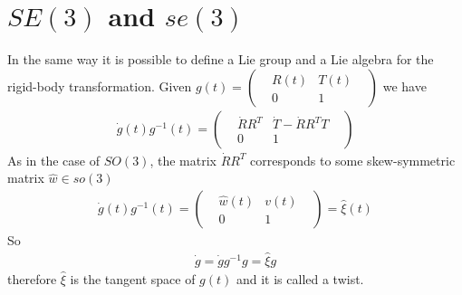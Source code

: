 \documentclass{report}
\begin{document}
\section{$SE(3)$ and $se(3)$}
In the same way it is possible to define a Lie group and a Lie algebra for the rigid-body transformation.
Given $g(t) = \left(
    \begin{matrix}
        &R(t) &T(t)&  \\
        &0 &1& 
    \end{matrix} 
    \right)$ we have
\begin{align}
    \dot{g}(t)g^{-1}(t) = \left(
        \begin{matrix}
            &\dot{R}R^T &\dot{T} - \dot{R}R^TT &  \\
            &0 &1& 
        \end{matrix} 
        \right)
\end{align}
As in the case of $SO(3)$, the matrix  $\dot{R}R^T$ corresponds 
to some skew-symmetric matrix $\hat{w} \in so(3)$
\begin{align}
    \dot{g}(t)g^{-1}(t) = \left(
        \begin{matrix}
            &\hat{w}(t) & v(t) &  \\
            &0 &1& 
        \end{matrix} 
        \right) = \hat{\xi}(t)
\end{align}
So 
\begin{align}
    \dot{g}= \dot{g}g^{-1}g = \hat{\xi}g
\end{align}
therefore $\hat{\xi}$ is the tangent space of $g(t)$ and it is called a twist.
\end{document}
